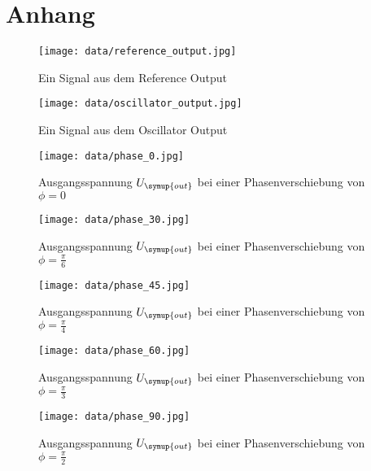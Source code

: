 \newpage
\section{Anhang}
\label{sec:Anhang}

\begin{figure}
  \centering
  \texttt{[image: data/reference\_output.jpg]}
  \caption{Ein Signal aus dem Reference Output}
  \label{fig:reference_output}
\end{figure}

\begin{figure}
  \centering
  \texttt{[image: data/oscillator\_output.jpg]}
  \caption{Ein Signal aus dem Oscillator Output}
  \label{fig:oscillator_output}
\end{figure}



\begin{figure}
  \centering
  \texttt{[image: data/phase\_0.jpg]}
  \caption{Ausgangsspannung $U_{\symup{out}}$ bei einer Phasenverschiebung
  von $\phi=0$}
  \label{fig:phase_0}
\end{figure}

\begin{figure}
  \centering
  \texttt{[image: data/phase\_30.jpg]}
  \caption{Ausgangsspannung $U_{\symup{out}}$ bei einer Phasenverschiebung
  von $\phi=\frac{\pi}{6}$}
  \label{fig:phase_30}
\end{figure}

\begin{figure}
  \centering
  \texttt{[image: data/phase\_45.jpg]}
  \caption{Ausgangsspannung $U_{\symup{out}}$ bei einer Phasenverschiebung
  von $\phi=\frac{\pi}{4}$}
  \label{fig:phase_45}
\end{figure}

\begin{figure}
  \centering
  \texttt{[image: data/phase\_60.jpg]}
  \caption{Ausgangsspannung $U_{\symup{out}}$ bei einer Phasenverschiebung
  von $\phi=\frac{\pi}{3}$}
  \label{fig:phase_60}
\end{figure}

\begin{figure}
  \centering
  \texttt{[image: data/phase\_90.jpg]}
  \caption{Ausgangsspannung $U_{\symup{out}}$ bei einer Phasenverschiebung
  von $\phi=\frac{\pi}{2}$}
  \label{fig:phase_0}
\end{figure}





